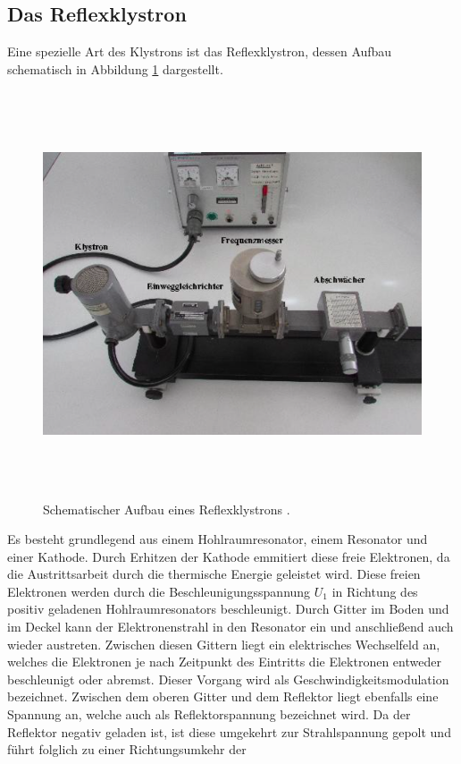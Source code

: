 \subsection{Das Reflexklystron}
Eine spezielle Art des Klystrons ist das Reflexklystron, dessen Aufbau schematisch in Abbildung \ref{fig:kly}
dargestellt.
\begin{figure}[H]
  \centering
  \includegraphics[height=12cm]{Aufbau.png}
  \caption{Schematischer Aufbau eines Reflexklystrons \cite{Kly}.}
  \label{fig:kly}
\end{figure}
Es besteht grundlegend aus einem Hohlraumresonator, einem Resonator und einer Kathode.
Durch Erhitzen der Kathode emmitiert diese freie Elektronen, da die Austrittsarbeit durch die thermische
Energie geleistet wird. Diese freien Elektronen werden durch die Beschleunigungsspannung $U_1$ in Richtung
des positiv geladenen Hohlraumresonators beschleunigt. Durch Gitter im Boden und im Deckel kann der Elektronenstrahl
in den Resonator ein und anschließend auch wieder austreten. Zwischen diesen Gittern liegt ein elektrisches
Wechselfeld an, welches die Elektronen je nach Zeitpunkt des Eintritts die Elektronen entweder beschleunigt oder
abremst. Dieser Vorgang wird als Geschwindigkeitsmodulation bezeichnet. Zwischen dem oberen Gitter und dem
Reflektor liegt ebenfalls eine Spannung an, welche auch als Reflektorspannung bezeichnet wird. Da der Reflektor negativ
geladen ist, ist diese umgekehrt zur Strahlspannung gepolt und führt folglich zu einer Richtungsumkehr der

